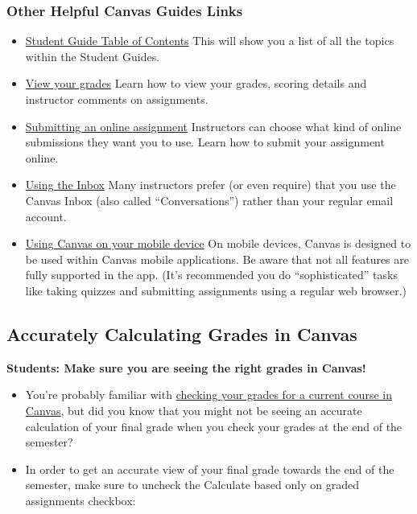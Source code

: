 \documentclass[
]{book}
\begin{document}
\hypertarget{other-helpful-canvas-guides-links}{%
\subsubsection{Other Helpful Canvas Guides Links}\label{other-helpful-canvas-guides-links}}

\begin{itemize}
\item
  \href{https://community.canvaslms.com/t5/Student-Guide/tkb-p/student}{Student Guide Table of Contents}
  This will show you a list of all the topics within the Student Guides.
\item
  \href{https://community.canvaslms.com/t5/Student-Guide/How-do-I-view-my-grades-in-a-current-course/ta-p/493}{View your grades}
  Learn how to view your grades, scoring details and instructor comments on assignments.
\item
  \href{https://community.canvaslms.com/t5/Student-Guide/How-do-I-submit-an-online-assignment/ta-p/503}{Submitting an online assignment}
  Instructors can choose what kind of online submissions they want you to use. Learn how to submit your assignment online.
\item
  \href{https://community.canvaslms.com/t5/Student-Guide/How-do-I-use-the-Inbox-as-a-student/ta-p/532}{Using the Inbox}
  Many instructors prefer (or even require) that you use the Canvas Inbox (also called ``Conversations'') rather than your regular email account.
\item
  \href{https://community.canvaslms.com/t5/Student-Guide/How-can-I-use-Canvas-on-my-mobile-device-as-a-student/ta-p/282}{Using Canvas on your mobile device}
  On mobile devices, Canvas is designed to be used within Canvas mobile applications. Be aware that not all features are fully supported in the app. (It's recommended you do ``sophisticated'' tasks like taking quizzes and submitting assignments using a regular web browser.)
\end{itemize}

\hypertarget{accurately-calculating-grades-in-canvas}{%
\subsection{Accurately Calculating Grades in Canvas}\label{accurately-calculating-grades-in-canvas}}

\textbf{Students: Make sure you are seeing the right grades in Canvas!}

\begin{itemize}
\item
  You're probably familiar with \href{https://community.canvaslms.com/t5/Student-Guide/How-do-I-view-my-grades-in-a-current-course/ta-p/493}{checking your grades for a current course in Canvas}, but did you know that you might not be seeing an accurate calculation of your final grade when you check your grades at the end of the semester?
\item
  In order to get an accurate view of your final grade towards the end of the semester, make sure to uncheck the Calculate based only on graded assignments checkbox:
\end{itemize}
\end{document}
